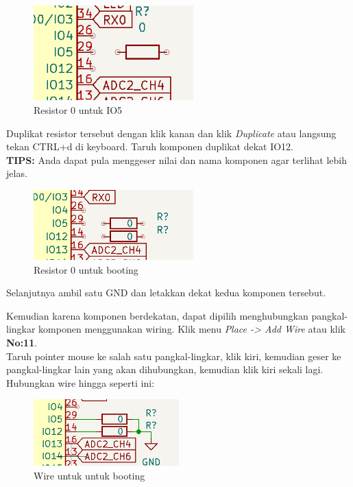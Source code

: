 \documentclass[12pt]{book}
\begin{document}
	\begin{figure}[!ht]
		\centering
		\includegraphics[width=0.55\textwidth]{images/sch/sch_12}
		\caption{Resistor 0 untuk IO5}
	\end{figure}

	Duplikat resistor tersebut dengan klik kanan dan klik \textit{Duplicate}
	atau langsung tekan CTRL+d di keyboard.
	Taruh komponen duplikat dekat IO12.\\

	\textbf{TIPS:} Anda dapat pula menggeser nilai dan nama komponen agar terlihat lebih jelas.

	\begin{figure}[!ht]
		\centering
		\includegraphics[width=0.55\textwidth]{images/sch/sch_13}
		\caption{Resistor 0 untuk booting}
	\end{figure}

	Selanjutnya ambil satu GND dan letakkan dekat kedua komponen tersebut.

	\newpage
	Kemudian karena komponen berdekatan, dapat dipilih menghubungkan pangkal-lingkar komponen
	menggunakan wiring.
	Klik menu \textit{Place -> Add Wire} atau klik \textbf{No:11}.\\

	Taruh pointer mouse ke salah satu pangkal-lingkar, klik kiri,
	kemudian geser ke pangkal-lingkar lain yang akan dihubungkan, kemudian klik kiri sekali lagi.\\

	Hubungkan wire hingga seperti ini:

	\begin{figure}[!ht]
		\centering
		\includegraphics[width=0.5\textwidth]{images/sch/sch_14}
		\caption{Wire untuk untuk booting}
	\end{figure}
\end{document}
